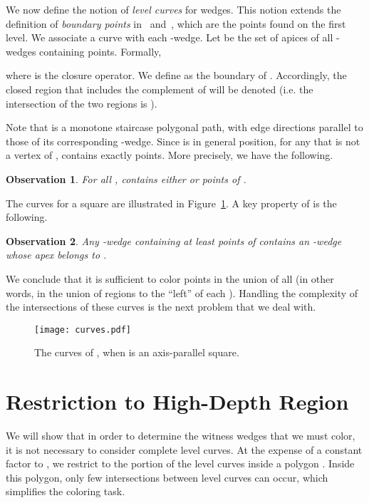 \documentclass[english,11pt]{article}
\newtheorem{observation}{Observation}
\begin{document}
We now define the notion of \emph{level curves} for wedges. This notion extends the 
definition of {\em boundary points} in~\cite{PT07} and~\cite{Pach86}, which are the points found on the first level.
We associate a curve with each -wedge. 
Let  be the set of apices of all -wedges containing  points. Formally,

\noindent where  is the closure operator. We define  as the boundary of .   Accordingly, the closed region that includes the complement of   will be denoted  (i.e. the intersection of the two regions is ).\medskip

Note that  is a monotone staircase polygonal path, with edge directions
parallel to those of its corresponding -wedge. Since  is in general
position,  for any  that is not a vertex of ,
 contains exactly  points. More precisely, we have the following.
\begin{observation}
\label{obs:rorrp1}
For all ,  contains either  or  points of .
\end{observation}
\noindent The curves  for a square are illustrated in Figure~\ref{fig:curves}. A key property of  is the following.
\begin{observation}
Any -wedge containing at least  points of  contains an -wedge whose apex belongs to .
\end{observation}
We conclude that it is sufficient to color points in the union of 
all  (in other words, in the union of regions to the ``left'' of each ).   Handling the complexity of the intersections of these curves is the next problem that we deal with.



\begin{figure}[htb]
\begin{center}
\texttt{[image: curves.pdf]}
\end{center}
\caption{\label{fig:curves} The curves of , when  is an axis-parallel square.}
\end{figure}

\section{Restriction to High-Depth Region}
\label{sec:truncation}
We will show that in order to determine the witness wedges that we must  color, it is not necessary to consider complete level curves. At the expense of a constant factor to , we restrict to the portion of the level curves inside a polygon . Inside this polygon, only few intersections between level curves can occur, which simplifies the coloring task.\medskip 
\end{document}
